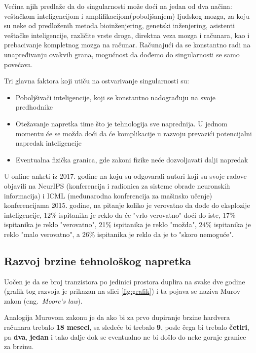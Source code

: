 \documentclass[a4paper]{article}
\begin{document}
Većina njih predlaže da do singularnosti može doći na jedan od dva načina: veštačkom inteligencijom i amplifikacijom(poboljšanjem) ljudskog mozga, za koju su neke od predloženih metoda bioinženjering, genetski inženjering, asistenti veštačke inteligencije, različite vrste droga, direktna veza mozga i računara, kao i prebacivanje kompletnog mozga na računar. Računajući da se konstantno radi na unapređivanju ovakvih grana, mogućnost da dođemo do singularnosti se samo povećava. 

Tri glavna faktora koji utiču na ostvarivanje singularnosti su: \cite{mog-2}
\begin{itemize}
\item Poboljšivači inteligencije, koji se konstantno nadograđuju na svoje predhodnike 
\item Otežavanje napretka time što je tehnologija sve naprednija. U jednom momentu će se možda doći da će komplikacije u razvoju prevazići potencijalni napredak inteligencije
\item Eventualna fizička granica, gde zakoni fizike neće dozvoljavati dalji napredak  
\end{itemize} 
U online anketi iz 2017. godine na koju su odgovarali autori koji su svoje radove objavili na NeurIPS (konferencija i radionica za sisteme obrade neuronskih informacija) i ICML (međunarodna konferencija za mašinsko učenje) konferencijama 2015. godine, na pitanje koliko je verovatno da dođe do eksplozije inteligencije, 12\% ispitanika je reklo da će "vrlo verovatno" doći do iste, 17\% ispitanika je reklo "verovatno", 21\% ispitanika je reklo "možda", 24\% ispitanika je reklo "malo verovatno", a 26\% ispitanika je reklo da je to "skoro nemoguće". \cite{mog-3}

\subsection{Razvoj brzine tehnološkog napretka}

Uočen je da se broj tranzistora po jedinici prostora duplira na svake dve godine (grafik tog razvoja je prikazan na slici \ref{fig:grafik}) i ta pojava se naziva Murov zakon (eng.~{\em Moore's law}). 

Analogija Murovom zakonu je da ako bi za prvo dupiranje brzine hardvera računara trebalo \textbf{18 meseci}, sa sledeće bi trebalo \textbf{9}, posle čega bi trebalo \textbf{četiri}, pa \textbf{dva}, \textbf{jedan} i tako dalje dok se eventualno ne bi došlo do neke gornje granice za brzinu.
\end{document}
